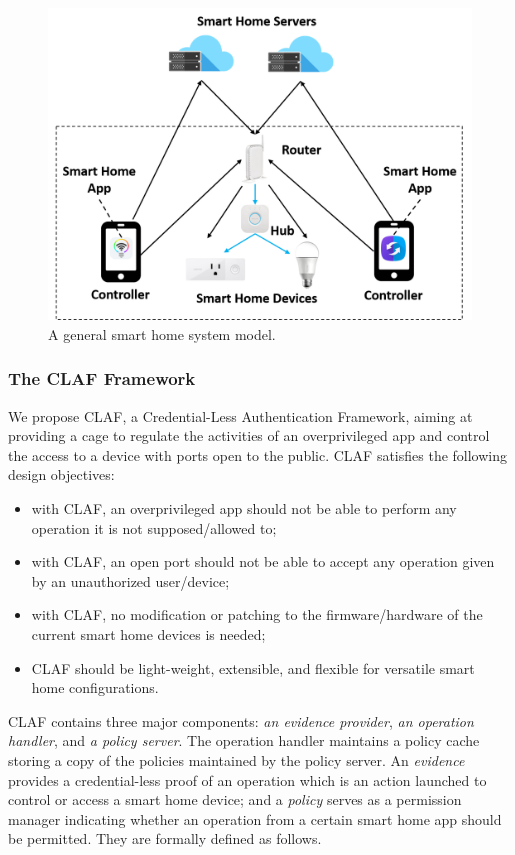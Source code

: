 \documentclass[letterpaper,12pt]{article}
\begin{document}
\begin{figure}[!htb]
        \centering
        \includegraphics[scale=0.3]{system.png}
        \caption{A general smart home system model.}
        \label{fig:system}
\end{figure}




\subsubsection{The CLAF Framework} \label{sec:CLAF:Framework}

We propose CLAF, a Credential-Less Authentication Framework, aiming at providing a cage to regulate the activities of an overprivileged app and control the access to a device with ports open to the public. CLAF satisfies the following design objectives:
\begin{itemize}
\item with CLAF, an overprivileged app should not be able to perform any operation it is not supposed/allowed to;
\item with CLAF, an open port should not be able to accept any operation given by an unauthorized user/device;
\item with CLAF, no modification or patching to the firmware/hardware of the current smart home devices is needed;
\item CLAF should be light-weight, extensible, and flexible for versatile smart home configurations. 
\end{itemize}

CLAF contains three major components: \emph{an evidence provider}, \emph{an operation handler}, and \emph{a policy server}. The operation handler maintains a policy cache storing a copy of the policies maintained by the policy server. An \textit{evidence} provides a credential-less proof of an operation which is an action launched to control or access a smart home device; and a \textit{policy} serves as a permission manager indicating whether an operation from a certain smart home app should be permitted. They are formally defined as follows.
\end{document}
